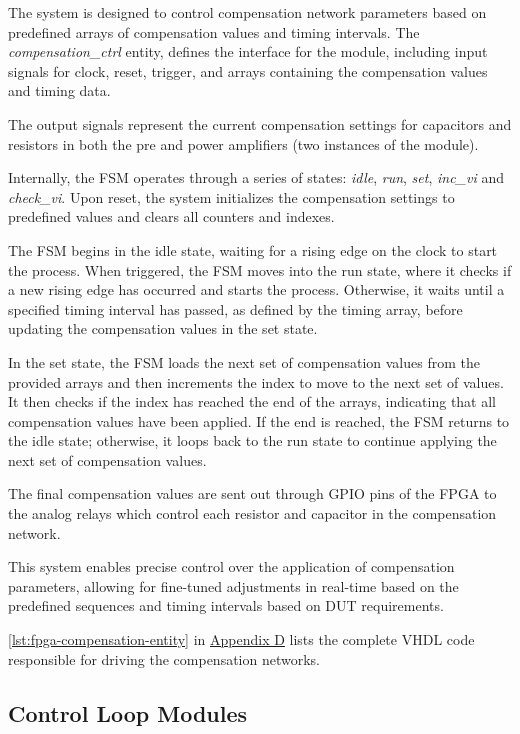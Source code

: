 The system is designed to control compensation network parameters based on
predefined arrays of compensation values and timing intervals.
The \emph{compensation\_ctrl} entity, defines the interface for the module,
including input signals for clock, reset, trigger, and arrays containing
the compensation values and timing data.

The output signals represent the current compensation settings for capacitors
and resistors in both the pre and power amplifiers
(two instances of the module).

Internally, the \acs{FSM} operates through a series of states: \emph{idle},
\emph{run}, \emph{set}, \emph{inc\_vi} and \emph{check\_vi}.
Upon reset, the system initializes the compensation settings to predefined
values and clears all counters and indexes.

The \acs{FSM} begins in the idle state, waiting for a rising edge on the
clock to start the process.
When triggered, the \acs{FSM} moves into the run state, where it checks if a
new rising edge has occurred and starts the process.
Otherwise, it waits until a specified timing interval has passed, as defined by
the timing array, before updating the compensation values in the set state.

In the set state, the \acs{FSM} loads the next set of compensation values
from the provided arrays and then increments the index to move to the next set
of values. It then checks if the index has reached the end of the arrays,
indicating that all compensation values have been applied.
If the end is reached, the \acs{FSM} returns to the idle state; otherwise, it
loops back to the run state to continue applying the next set of compensation
values.

The final compensation values are sent out through \acs{GPIO} pins of the
FPGA to the analog relays which control each resistor and capacitor in the
compensation network.

This system enables precise control over the application of compensation
parameters, allowing for fine-tuned adjustments in real-time based on the
predefined sequences and timing intervals based on \acs{DUT} requirements.

\autoref{lst:fpga-compensation-entity} in
\hyperref[sec:hvs-fpga-compensation-vhdl]{Appendix D} lists the complete VHDL
code responsible for driving the compensation networks.

\subsection{Control Loop Modules}
\label{subsec:fpga-control-loop-modules}

